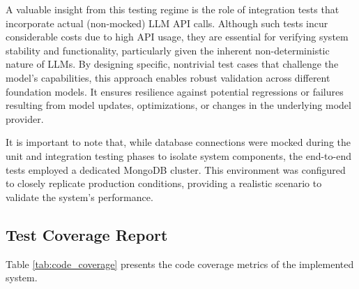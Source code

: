 A valuable insight from this testing regime is the role of integration tests that incorporate actual (non-mocked) LLM API calls. Although such tests incur considerable costs due to high API usage, they are essential for verifying system stability and functionality, particularly given the inherent non-deterministic nature of LLMs. By designing specific, nontrivial test cases that challenge the model's capabilities, this approach enables robust validation across different foundation models. It ensures resilience against potential regressions or failures resulting from model updates, optimizations, or changes in the underlying model provider.

It is important to note that, while database connections were mocked during the unit and integration testing phases to isolate system components, the end-to-end tests employed a dedicated MongoDB cluster. This environment was configured to closely replicate production conditions, providing a realistic scenario to validate the system's performance.


\subsection*{Test Coverage Report}
Table \ref{tab:code_coverage} presents the code coverage metrics of the implemented system.

\begin{table}[H]
\centering
\caption{Code coverage statistics by package.}
\label{tab:code_coverage}
\end{table}






